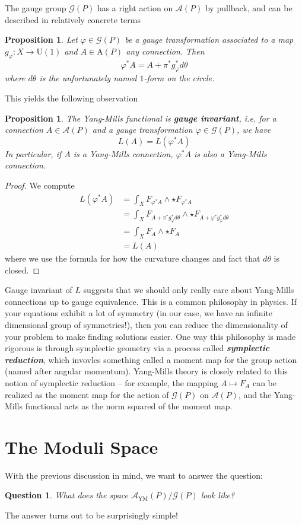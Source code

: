 \documentclass[psamsfonts, 12pt]{amsart}
\newtheorem{prop}[thm]{Proposition}
\newtheorem{quest}[thm]{Question}
\theoremstyle{definition}
\theoremstyle{remark}
\newcommand{\ib}[1]{\textbf{\textit{#1}}}
\begin{document}
The gauge group $\mathscr{G}(P)$ has a right action on $\mathscr{A}(P)$ by pullback,
and can be described in relatively concrete terms
%
\begin{prop}
Let $\varphi \in \mathscr{G}(P)$ be a gauge transformation associated to
a map $g_\varphi : X \to \mathrm{U}(1)$ and $A \in \mathrm{A}(P)$ any connection.
Then
\[
\varphi^*A = A + \pi^*g_\varphi^*d\theta
\]
where $d\theta$ is the unfortunately named $1$-form on the circle.
\end{prop}
%
This yields the following observation
%
\begin{prop}
The Yang-Mills functional is \ib{gauge invariant}, i.e. for a connection
$A \in \mathscr{A}(P)$ and a gauge transformation $\varphi \in \mathscr{G}(P)$,
we have
\[
L(A) = L(\varphi^*A)
\]
In particular, if $A$ is a Yang-Mills connection, $\varphi^*A$ is also a Yang-Mills
connection.
\end{prop}
%
\begin{proof}
We compute
\begin{align*}
L(\varphi^*A) &= \int_X F_{\varphi^*A}\wedge\star F_{\varphi^*A} \\
&= \int_X F_{A + \pi^*g_\varphi^*d\theta}\wedge\star
F_{A + \varphi^*g_\varphi^*d\theta} \\
&= \int_X F_A \wedge\star F_A \\
&= L(A)
\end{align*}
where we use the formula for how the curvature changes and fact that $d\theta$ is closed.
\end{proof}
%
Gauge invariant of $L$ suggests that we should only really care about Yang-Mills
connections up to gauge equivalence. This is a common philosophy in physics. If your
equations exhibit a lot of symmetry (in our case, we have an infinite dimensional
group of symmetries!), then you can reduce the dimensionality of your problem to
make finding solutions easier. One way this philosophy is made rigorous is
through symplectic geometry via a process called \ib{symplectic reduction},
which invovles something called a moment map for the group action
(named after angular momentum). Yang-Mills theory is closely related to
this notion of symplectic reduction -- for example, the mapping $A \mapsto F_A$
can be realized as the moment map for the action of $\mathscr{G}(P)$ on $\mathscr{A}(P)$,
and the Yang-Mills functional acts as the norm squared of the moment map. \\
%
\section{The Moduli Space}
%
With the previous discussion in mind, we want to answer the question:
\begin{quest}
What does the space $\mathscr{A}_{\mathrm{YM}}(P) / \mathscr{G}(P)$ look like?
\end{quest}
%
The answer turns out to be surprisingly simple! \\
\end{document}
